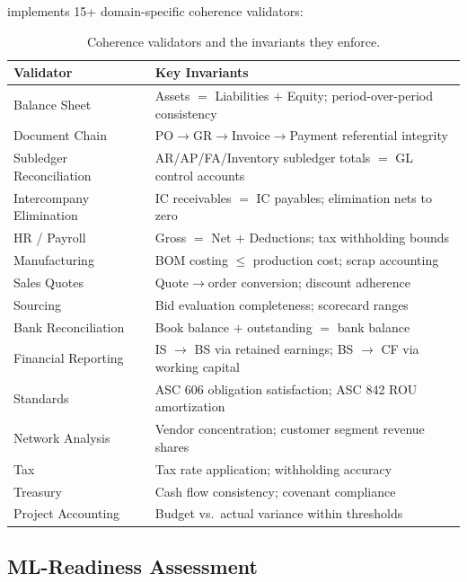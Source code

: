 \system{} implements 15+ domain-specific coherence validators:

\begin{table}[H]
\centering
\caption{Coherence validators and the invariants they enforce.}
\label{tab:validators}
\small
\begin{tabular}{p{3.2cm}p{9cm}}
\toprule
\textbf{Validator} & \textbf{Key Invariants} \\
\midrule
Balance Sheet &
  Assets $=$ Liabilities $+$ Equity; period-over-period consistency \\
Document Chain &
  PO$\to$GR$\to$Invoice$\to$Payment referential integrity \\
Subledger Reconciliation &
  AR/AP/FA/Inventory subledger totals $=$ GL control accounts \\
Intercompany Elimination &
  IC receivables $=$ IC payables; elimination nets to zero \\
HR / Payroll &
  Gross $=$ Net $+$ Deductions; tax withholding bounds \\
Manufacturing &
  BOM costing $\leq$ production cost; scrap accounting \\
Sales Quotes &
  Quote$\to$order conversion; discount adherence \\
Sourcing &
  Bid evaluation completeness; scorecard ranges \\
Bank Reconciliation &
  Book balance $+$ outstanding $=$ bank balance \\
Financial Reporting &
  IS $\to$ BS via retained earnings; BS $\to$ CF via working capital \\
Standards &
  ASC 606 obligation satisfaction; ASC 842 ROU amortization \\
Network Analysis &
  Vendor concentration; customer segment revenue shares \\
Tax &
  Tax rate application; withholding accuracy \\
Treasury &
  Cash flow consistency; covenant compliance \\
Project Accounting &
  Budget vs.\ actual variance within thresholds \\
\bottomrule
\end{tabular}
\end{table}

\subsection{ML-Readiness Assessment}
\label{sec:eval_ml}

